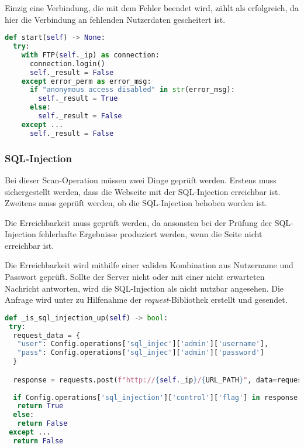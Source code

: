 Einzig eine Verbindung, die mit dem Fehler  beendet wird, zählt als erfolgreich, da hier die Verbindung an fehlenden Nutzerdaten gescheitert ist.
 
\begin{lstlisting}[language=Python, frame=single, caption={Big Brother FTP Scan-Operation}, captionpos=b, label={lst:bigbrother-ftp-save}]
def start(self) -> None:
  try:
    with FTP(self._ip) as connection:
      connection.login()
      self._result = False
    except error_perm as error_msg:
      if "anonymous access disabled" in str(error_msg):
        self._result = True
      else:
        self._result = False
    except ...
      self._result = False
\end{lstlisting} 

\subsubsection{SQL-Injection}

Bei dieser Scan-Operation müssen zwei Dinge geprüft werden. Erstens muss sichergestellt werden, dass die Webseite mit der SQL-Injection erreichbar ist. Zweitens muss geprüft werden, ob die SQL-Injection behoben worden ist. 

Die Erreichbarkeit muss geprüft werden, da ansonsten bei der Prüfung der SQL-Injection fehlerhafte Ergebnisse produziert werden, wenn die Seite nicht erreichbar ist.

Die Erreichbarkeit wird mithilfe einer validen Kombination aus Nutzername und Passwort geprüft. Sollte der Server nicht oder mit einer nicht erwarteten Nachricht antworten, wird die SQL-Injection als nicht nutzbar angesehen. Die Anfrage wird unter zu Hilfenahme der \textit{request}-Bibliothek erstellt und gesendet. 

\begin{lstlisting}[language=Python, frame=single, caption={Big Brother SQL-Injection UP}, captionpos=b, label={lst:bigbrother-sql-injection-up}]
def _is_sql_injection_up(self) -> bool:
 try:
  request_data = {
   "user": Config.operations['sql_injec']['admin']['username'],
   "pass": Config.operations['sql_injec']['admin']['password']
  }

  response = requests.post(f"http://{self._ip}/{URL_PATH}", data=request_data)
  
  if Config.operations['sql_injection']['control']['flag'] in response.text and Config.operations['sql_injection']['control']['value'] in response.text:
   return True
  else:
   return False
 except ...
  return False
\end{lstlisting}

